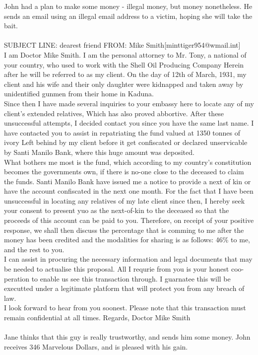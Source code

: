 \documentclass{article}
\begin{document}
John had a plan to make some money {-} illegal money, but money nonetheless.
He sends an email using an illegal email address to a victim, hoping she will take the bait.
\\\\
SUBJECT LINE: dearest friend
FROM: Mike Smith[minttiger954@wmail.int]
\\
I am Doctor Mike Smith.
I am the personal attorney to Mr. Tony, a national of your country, who used to work with the Shell Oil Producing Company
Herein after he will be referred to as my client.
On the day of 12th of March, 1931, my client and his wife and their only daughter were kidnapped and taken away by unidentified gunmen from their home in Kaduna.
\\
Since then I have made several inquiries to your embassy here to locate any of my client's extended relatives, Which has also proved abbortive.
After these unsuccessful attempts, I decided contact you since you have the same last name.
I have contacted you to assist in repatriating the fund valued at 1350 tonnes of ivory Left behind by my client before it get confiscated or declared unservicable by Santi Manilo Bank, where this huge amount was deposited.
\\
What bothers me most is the fund, which according to my country's constitution becomes the governments own, if there is no{-}one close to the deceased to claim the funds.
Santi Manilo Bank have issued me a notice to provide a next of kin or have the account confiscated in the next one month.
For the fact that I have been unsuccessful in locating any relatives of my late client since then, I hereby seek your consent to present yuo as the next{-}of{-}kin to the deceased so that the proceeds of this account can be paid to you.
Therefore, on receipt of your positive response, we shall then discuss the percentage that is comming to me after the money has been credited and the modalities for sharing is as follows: 46\% to me, and the rest to you.
\\
I can assist in procuring the necessary information and legal documents that may be needed to actualise this proposal.
All I requrie from you is your honest coo{-}peration to enable us see this transaction through.
I guarnatee this will be executted under a legitimate platform that will protect you from any breach of law.
\\
I look forward to hear from you soonest.
Please note that this transaction must remain confidential at all times.
Regards, Doctor Mike Smith
\\\\
Jane thinks that this guy is really trustworthy, and sends him some money.
John receives 346 Marvelous Dollars, and is pleased with his gain.
\end{document}
